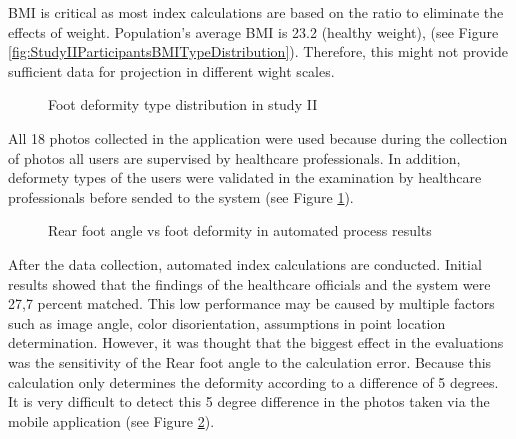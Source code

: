 BMI is critical as most index calculations are based on the ratio to eliminate the effects of weight. Population's average BMI is 23.2 (healthy weight), (see Figure \ref{fig:StudyIIParticipantsBMITypeDistribution}). Therefore, this might not provide sufficient data for projection in different wight scales.

\begin{figure}[htbp]
\centering
{}
\caption{Foot deformity type distribution in study II}
\label{fig:StudyIIFootDeformityTypeDistribution}
\end{figure} 

All 18 photos collected in the application were used because during the collection of photos all users are supervised by healthcare professionals. In addition, deformety types of the users were validated in the examination by healthcare professionals before sended to the system (see Figure  \ref{fig:StudyIIFootDeformityTypeDistribution}).

\begin{figure}[htbp]
\centering
{}
\caption{Rear foot angle vs foot deformity in automated process results}
\label{fig:StudyIIFootDeformityAutomatedDegreesAndDeformityResults}
\end{figure} 

After the data collection, automated index calculations are conducted. Initial results showed that the findings of the healthcare officials and the system were 27,7 percent matched. This low performance may be caused by multiple factors such as image angle, color disorientation, assumptions in point location determination. However, it was thought that the biggest effect in the evaluations was the sensitivity of the Rear foot angle to the calculation error. Because this calculation only determines the deformity according to a difference of 5 degrees. It is very difficult to detect this 5 degree difference in the photos taken via the mobile application (see Figure \ref{fig:StudyIIFootDeformityAutomatedDegreesAndDeformityResults}). 
